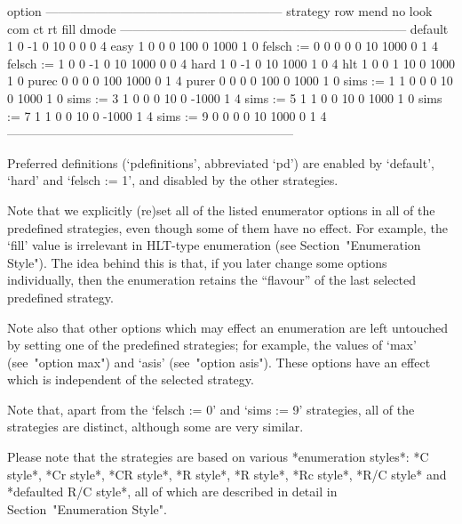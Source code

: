\begintt
                               option
            ---------------------------------------------------------
strategy    row  mend  no  look  com    ct     rt  fill  dmode
---------------------------------------------------------------------
default       1     0  -1     0   10     0      0     0      4
easy          1     0   0     0  100     0   1000     1      0
felsch := 0   0     0   0     0   10  1000      0     1      4
felsch := 1   0     0  -1     0   10  1000      0     0      4
hard          1     0  -1     0   10  1000      1     0      4
hlt           1     0   0     1   10     0   1000     1      0
purec         0     0   0     0  100  1000      0     1      4
purer         0     0   0     0  100     0   1000     1      0
sims := 1     1     0   0     0   10     0   1000     1      0
sims := 3     1     0   0     0   10     0  -1000     1      4
sims := 5     1     1   0     0   10     0   1000     1      0
sims := 7     1     1   0     0   10     0  -1000     1      4
sims := 9     0     0   0     0   10  1000      0     1      4
---------------------------------------------------------------------
\endtt

Preferred definitions (`pdefinitions', abbreviated `pd') are enabled by
`default', `hard' and `felsch := 1', and disabled by the other strategies.

Note that we explicitly (re)set all of the listed  enumerator  options
in all of the predefined strategies, even though some of them have  no
effect. For example,  the  `fill'  value  is  irrelevant  in  HLT-type
enumeration (see Section~"Enumeration Style"). The idea behind this is
that,  if  you  later  change  some  options  individually,  then  the
enumeration retains the ``flavour'' of the last selected  predefined
strategy.

Note also that other options which may effect an enumeration are  left
untouched by setting one of the predefined  strategies;  for  example,
the values of `max' (see~"option max") and `asis' (see~"option asis").
These options have an effect which  is  independent  of  the  selected
strategy.

Note that, apart from the `felsch := 0' and `sims  :=  9'  strategies,
all of the strategies are distinct, although some are very similar.


Please note that the strategies  are  based  on  various  *enumeration
styles*: *C style*, *Cr style*, *CR style*, *R  style*,  *R\*  style*,
*Rc style*, *R/C style* and *defaulted R/C style*, all  of  which  are
described in detail in Section~"Enumeration Style".

